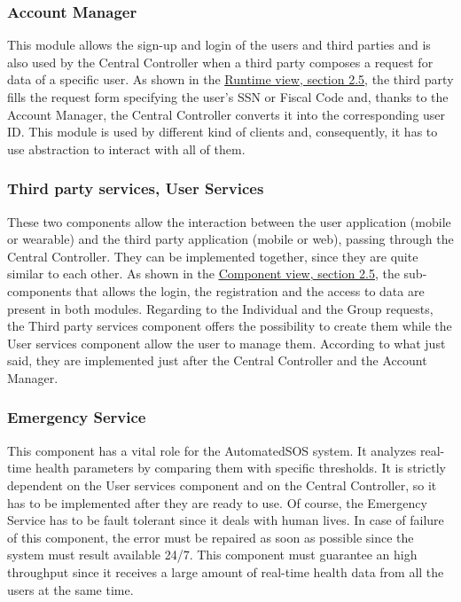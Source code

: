 \subsubsection{Account Manager}
This module allows the sign-up and login of the users and third parties and is also used by the Central Controller when a third party composes a request for data of a specific user. As shown in the \hyperlink{RV}{\underline{Runtime view, section 2.5}}, the third party fills the request form specifying the user's SSN or Fiscal Code and, thanks to the Account Manager, the Central Controller converts it into the corresponding user ID.
This module is used by different kind of clients and, consequently, it has to use abstraction to interact with all of them.

\subsubsection{Third party services, User Services}
These two components allow the interaction between the user application (mobile or wearable) and the third party application (mobile or web), passing through the Central Controller.
They can be implemented together, since they are quite similar to each other.
As shown in the \hyperlink{CV}{\underline{Component view, section 2.5}}, the sub-components that allows the login, the registration and the access to data are present in both modules.
Regarding to the Individual and the Group requests, the Third party services component offers the possibility to create them while the User services component allow the user to manage them.
According to what just said, they are implemented just after the Central Controller and the Account Manager.

\subsubsection{Emergency Service}
This component has a vital role for the AutomatedSOS system. It analyzes real-time health parameters by comparing them with specific thresholds. It is strictly dependent on the User services component and on the Central Controller, so it has to be implemented after they are ready to use.
Of course, the Emergency Service has to be fault tolerant since it deals with human lives. In case of failure of this component, the error must be repaired as soon as possible since the system must result available 24/7. 
This component must guarantee an high throughput since it receives a large amount of real-time health data from all the users at the same time.


